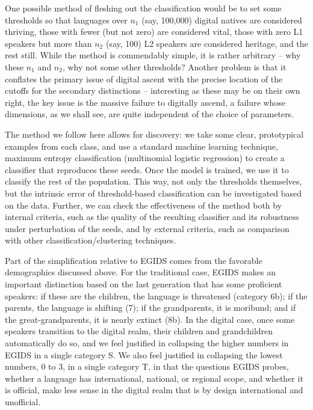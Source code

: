 \documentclass[10pt]{article}
\begin{document}
One possible method of fleshing out the classification would be to set some
thresholds so that languages over $n_1$ (say, 100,000) digital natives are
considered thriving, those with fewer (but not zero) are considered vital,
those with zero L1 speakers but more than $n_2$ (say, 100) L2 speakers are
considered heritage, and the rest {\color{black} still}.  While the method is
commendably simple, it is rather arbitrary -- why these $n_1$ and $n_2$, why
not some other thresholds?  Another problem is that it conflates the primary
issue of digital ascent with the precise location of the cutoffs for the
secondary distinctions -- interesting as these may be on their own right, the
key issue is the massive failure to digitally ascend, a failure whose
dimensions, as we shall see, are quite independent of the choice of
parameters.

The method we follow here allows for discovery: we take some clear,
prototypical examples from each class, and use a standard machine learning
technique, maximum entropy classification (multinomial logistic regression)
\cite{Hosmer:1989,Menard:2002} to create a classifier that reproduces these
seeds.  Once the model is trained, we use it to classify the rest of the
population. This way, not only the thresholds themselves, but the intrinsic
error of threshold-based classification can be investigated based on the
data. Further, we can check the effectiveness of the method both by internal
criteria, such as the quality of the resulting classifier and its robustness
under perturbation of the seeds, and by external criteria, such as comparison
with other classification/clustering techniques.

Part of the simplification relative to EGIDS comes from the favorable
demographics discussed above. For the traditional case, EGIDS makes an
important distinction based on the last generation that has some proficient
speakers: if these are the children, the language is threatened (category 6b);
if the parents, the language is shifting (7); if the grandparents, it is
moribund; and if the great-grandparents, it is nearly extinct (8b).  In the
digital case, once some speakers transition to the digital realm, their
children and grandchildren automatically do so, and we feel justified in
collapsing the higher numbers in EGIDS in a single category S.  We also feel
justified in collapsing the lowest numbers, 0 to 3, in a single category T, in
that the questions EGIDS probes, whether a language has international,
national, or regional scope, and whether it is official, make less sense in
the digital realm that is by design international and unofficial.
\end{document}
